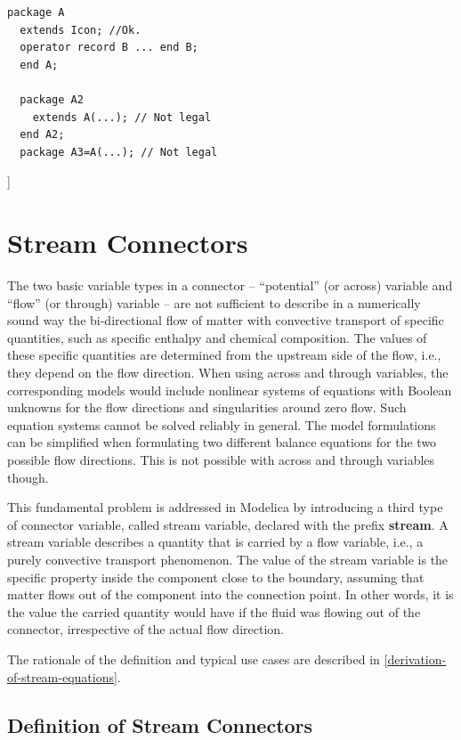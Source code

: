 \documentclass[10pt,a4paper]{report}
\def\doublelabel#1{\label{#1}\hypertarget{#1}{}}
\begin{document}
\begin{lstlisting}[language=modelica]
package A
  extends Icon; //Ok.
  operator record B ... end B;
  end A;

  package A2
    extends A(...); // Not legal
  end A2;
  package A3=A(...); // Not legal
\end{lstlisting}
{]}

\chapter{Stream Connectors}\doublelabel{stream-connectors}

The two basic variable types in a connector -- ``potential'' (or across)
variable and ``flow'' (or through) variable -- are not sufficient to
describe in a numerically sound way the bi-directional flow of matter
with convective transport of specific quantities, such as specific
enthalpy and chemical composition. The values of these specific
quantities are determined from the upstream side of the flow, i.e., they
depend on the flow direction. When using across and through variables,
the corresponding models would include nonlinear systems of equations
with Boolean unknowns for the flow directions and singularities around
zero flow. Such equation systems cannot be solved reliably in general.
The model formulations can be simplified when formulating two different
balance equations for the two possible flow directions. This is not
possible with across and through variables though.

This fundamental problem is addressed in Modelica by introducing a third
type of connector variable, called stream variable, declared with the
prefix \textbf{stream}. A stream variable describes a quantity that is
carried by a flow variable, i.e., a purely convective transport
phenomenon. The value of the stream variable is the specific property
inside the component close to the boundary, assuming that matter flows
out of the component into the connection point. In other words, it is
the value the carried quantity would have if the fluid was flowing out
of the connector, irrespective of the actual flow direction.

The rationale of the definition and typical use cases are described in
\ref{derivation-of-stream-equations}.

\section{Definition of Stream Connectors}\doublelabel{definition-of-stream-connectors}
\end{document}
